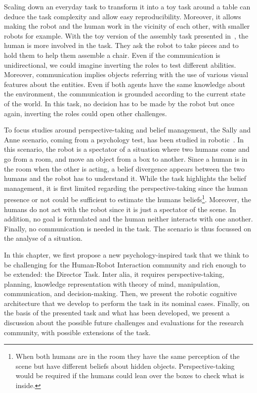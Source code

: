 Scaling down an everyday task to transform it into a toy task around a table can deduce the task complexity and allow easy reproducibility. Moreover, it allows making the robot and the human work in the vicinity of each other, with smaller robots for example. With the toy version of the assembly task presented in~\cite{brawer_2018_situated}, the human is more involved in the task. They ask the robot to take pieces and to hold them to help them assemble a chair. Even if the communication is unidirectional, we could imagine inverting the roles to test different abilities. Moreover, communication implies objects referring with the use of various visual features about the entities. Even if both agents have the same knowledge about the environment, the communication is grounded according to the current state of the world. In this task, no decision has to be made by the robot but once again, inverting the roles could open other challenges.

To focus studies around perspective-taking and belief management, the Sally and Anne scenario, coming from a psychology test, has been studied in robotic~\cite{milliez_2014_framework}. In this scenario, the robot is a spectator of a situation where two humans come and go from a room, and move an object from a box to another. Since a human is in the room when the other is acting, a belief divergence appears between the two humans and the robot has to understand it. While the task highlights the belief management, it is first limited regarding the perspective-taking since the human presence or not could be sufficient to estimate the humans beliefs\footnote{When both humans are in the room they have the same perception of the scene but have different beliefs about hidden objects. Perspective-taking would be required if the humans could lean over the boxes to check what is inside.}. Moreover, the humans do not act with the robot since it is just a spectator of the scene. In addition, no goal is formulated and the human neither interacts with one another. Finally, no communication is needed in the task. The scenario is thus focussed on the analyse of a situation.

In this chapter, we first propose a new psychology-inspired task that we think to be challenging for the Human-Robot Interaction community and rich enough to be extended: the Director Task. Inter alia, it requires perspective-taking, planning, knowledge representation with theory of mind, manipulation, communication, and decision-making. Then, we present the robotic cognitive architecture that we develop to perform the task in its nominal cases. Finally, on the basis of the presented task and what has been developed, we present a discussion about the possible future challenges and evaluations for the research community, with possible extensions of the task.

